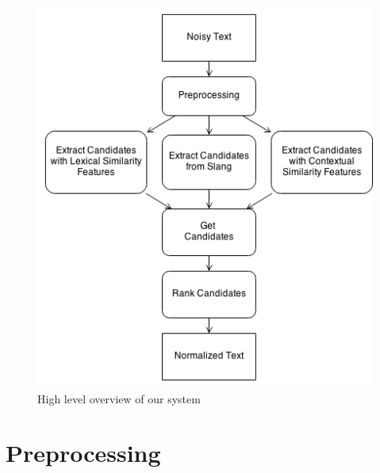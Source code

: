 \documentclass[a4paper,onesided,12pt]{report}
\begin{document}
\begin{figure}[htb]
\begin{center}
\includegraphics[scale=0.6]{fig/overview}
\caption{High level overview of our system}
\label{fig:overview}
\end{center}
\end{figure}

\section{Preprocessing}

\end{document}
